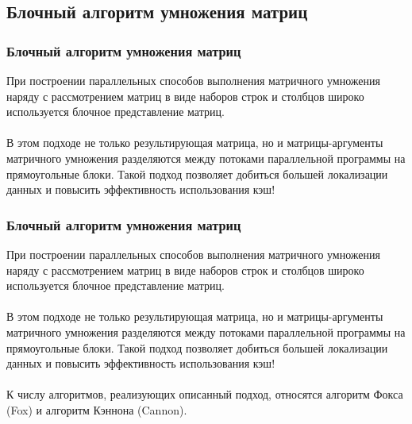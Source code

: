 \documentclass{beamer}
\begin{document}
\subsection{Блочный алгоритм умножения матриц}

\begin{frame}
\frametitle{Блочный алгоритм умножения матриц}

При построении параллельных способов выполнения матричного умножения наряду с рассмотрением матриц в виде наборов строк и столбцов широко используется блочное представление матриц.\\~\\

В этом подходе не только результирующая матрица, но и матрицы-аргументы матричного умножения разделяются между потоками параллельной программы на прямоугольные блоки. Такой подход позволяет добиться большей локализации данных и повысить эффективность использования кэш!
\end{frame}


\begin{frame}
\frametitle{Блочный алгоритм умножения матриц}

При построении параллельных способов выполнения матричного умножения наряду с рассмотрением матриц в виде наборов строк и столбцов широко используется блочное представление матриц.\\~\\

В этом подходе не только результирующая матрица, но и матрицы-аргументы матричного умножения разделяются между потоками параллельной программы на прямоугольные блоки. Такой подход позволяет добиться большей локализации данных и повысить эффективность использования кэш!\\~\\

К числу алгоритмов, реализующих описанный подход, относятся алгоритм Фокса (Fox) и алгоритм Кэннона (Cannon).
\end{frame}

\end{document}
